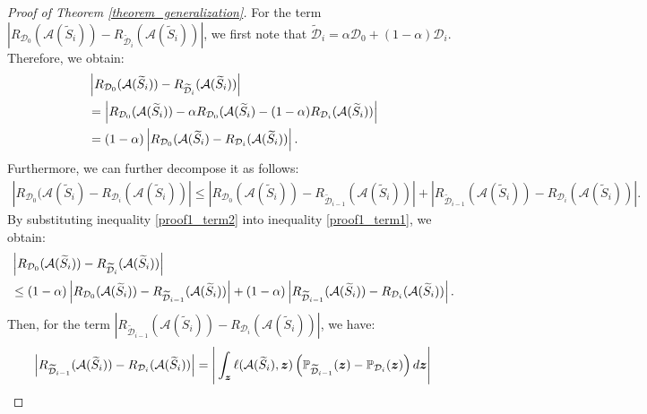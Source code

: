 \begin{proof}[Proof of Theorem \ref{theorem_generalization}]
For the term $\left|R_{\mathcal{D}_0}(\mathcal{A}(\widetilde{S}_i))-R_{\widetilde{\mathcal{D}}_i}(\mathcal{A}(\widetilde{S}_i))\right|$, we first note that $\widetilde{\mathcal{D}}_i=\alpha \mathcal{D}_0+(1-\alpha) \mathcal{D}_i$. Therefore, we obtain:
\begin{align}
    &\left|R_{\mathcal{D}_0}(\mathcal{A}(\widetilde{S}_i))-R_{\widetilde{\mathcal{D}}_i}(\mathcal{A}(\widetilde{S}_i))\right|\notag \\
    &=\left|R_{\mathcal{D}_0}(\mathcal{A}(\widetilde{S}_i))-\alpha R_{\mathcal{D}_0}(\mathcal{A}(\widetilde{S}_i)-(1-\alpha)R_{\mathcal{D}_i}(\mathcal{A}(\widetilde{S}_i))\right| \notag \\
    &=(1-\alpha)\left|R_{\mathcal{D}_0}(\mathcal{A}(\widetilde{S}_i)-R_{\mathcal{D}_i}(\mathcal{A}(\widetilde{S}_i))\right| .\label{proof1_term1}
\end{align}
Furthermore, we can further decompose it as follows:
\begin{align}
   \left|R_{\mathcal{D}_0}(\mathcal{A}(\widetilde{S}_i)-R_{\mathcal{D}_i}(\mathcal{A}(\widetilde{S}_i))\right| \leq \left|R_{\mathcal{D}_0}(\mathcal{A}(\widetilde{S}_i))-R_{\widetilde{\mathcal{D}}_{i-1}}(\mathcal{A}(\widetilde{S}_i))\right|+\left|R_{\widetilde{\mathcal{D}}_{i-1}}(\mathcal{A}(\widetilde{S}_i))-R_{\mathcal{D}_{i}}(\mathcal{A}(\widetilde{S}_i))\right| \label{proof1_term2}.
\end{align}
By substituting inequality \ref{proof1_term2} into inequality \ref{proof1_term1}, we obtain:
\begin{align}
    &\left|R_{\mathcal{D}_0}(\mathcal{A}(\widetilde{S}_i))-R_{\widetilde{\mathcal{D}}_i}(\mathcal{A}(\widetilde{S}_i))\right| \notag \\
    &\leq  (1-\alpha)\left|R_{\mathcal{D}_0}(\mathcal{A}(\widetilde{S}_i))-R_{\widetilde{\mathcal{D}}_{i-1}}(\mathcal{A}(\widetilde{S}_i))\right|+(1-\alpha)\left|R_{\widetilde{\mathcal{D}}_{i-1}}(\mathcal{A}(\widetilde{S}_i))-R_{\mathcal{D}_{i}}(\mathcal{A}(\widetilde{S}_i))\right| \label{proof1_term3}.
\end{align}
Then, for the term $|R_{\widetilde{\mathcal{D}}_{i-1}}(\mathcal{A}(\widetilde{S}_i))-R_{\mathcal{D}_{i}}(\mathcal{A}(\widetilde{S}_i))|$, we have:
\begin{align}
\left|R_{\widetilde{\mathcal{D}}_{i-1}}(\mathcal{A}(\widetilde{S}_i))-R_{\mathcal{D}_{i}}(\mathcal{A}(\widetilde{S}_i))\right|
&=\Bigg|\int_{\boldsymbol{z}}\ell(\mathcal{A}(\widetilde{S}_i),\boldsymbol{z})\left(\mathbb{P}_{\widetilde{\mathcal{D}}_{i-1}}(\boldsymbol{z})-\mathbb{P}_{\mathcal{D}_i}(\boldsymbol{z})\right)d\boldsymbol{z}\Bigg| \notag \\

\end{align}
\end{proof}
